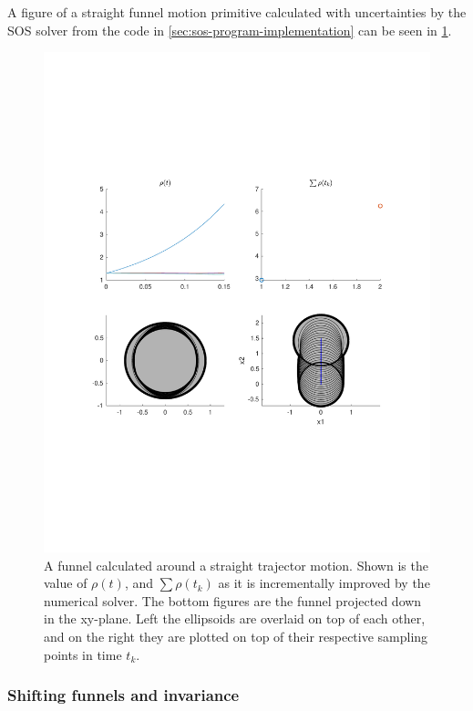 A figure of a straight funnel motion primitive calculated with uncertainties by
the \ac{SOS} solver from the code in \cref{sec:sos-program-implementation} can
be seen in \cref{fig:funnel-calculation-visuals}.
\begin{figure}
  \centering
  \includegraphics[scale=.5]{figures/method/funnel-calculation-visuals}
  \caption{A funnel calculated around a straight trajector motion. Shown is the
    value of \(\rho(t)\), and \(\sum \rho(t_k)\) as it is incrementally improved
    by the numerical solver. The bottom figures are the funnel projected down in
    the xy-plane. Left the ellipsoids are overlaid on top of each other, and on
    the right they are plotted on top of their respective sampling points in time \(t_k\).}
  \label{fig:funnel-calculation-visuals}
\end{figure}

\subsubsection{Shifting funnels and invariance}
\label{subsec:shifting-funnels}

